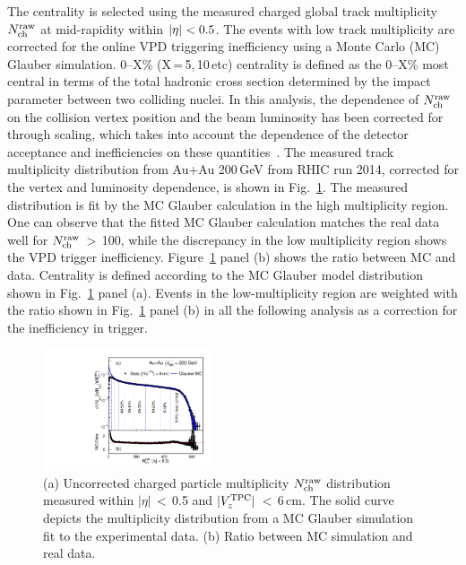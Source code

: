 \documentclass[%
 reprint,	
showpacs,
 amsmath,amssymb,
 aps,
 prc,
]{revtex4-1}
\begin{document}
The centrality is selected using the measured charged global track multiplicity $N_{\rm ch}^{\rm raw}$ at mid-rapidity within $|\eta|\ \rm{ < 0.5}$. The events with low track multiplicity are corrected for the online VPD triggering inefficiency using a Monte Carlo (MC) Glauber simulation. 0--X\% (X\,=\,5,\,10\,etc) centrality is defined as the 0--X\% most central in terms of the total hadronic cross section determined by the impact parameter between two colliding nuclei. In this analysis, the dependence of $N_{\rm ch}^{\rm raw}$ on the collision vertex position and the beam luminosity has been corrected for through scaling, which takes into account the dependence of the detector acceptance and inefficiencies on these quantities~\cite{PhysRevC.88.014902}. The measured track multiplicity distribution from Au+Au 200\,GeV from RHIC run 2014, corrected for the vertex and luminosity dependence, is shown in Fig.~\ref{fig:centrality}. The measured distribution is fit by the MC Glauber calculation in the high multiplicity region. One can observe that the fitted MC Glauber calculation matches the real data well for $N_{\rm ch}^{\rm raw}$\,$>$\,100, while the discrepancy in the low multiplicity region shows the VPD trigger inefficiency. Figure~\ref{fig:centrality} panel (b) shows the ratio between MC and data. Centrality is defined according to the MC Glauber model distribution shown in Fig.~\ref{fig:centrality} panel (a). Events in the low-multiplicity region are weighted with the ratio shown in Fig.~\ref{fig:centrality} panel (b) in all the following analysis as a correction for the inefficiency in trigger. 

\begin{figure}[h]
\centering
\includegraphics[width=0.45\textwidth]{fig/centrality.pdf}
  \caption{(a) Uncorrected charged particle multiplicity $N_{\rm ch}^{\rm raw}$ distribution measured within $|\eta|$\,$<$\,0.5 and $|V_z^{\rm{TPC}}|$\,$<$\,6\,cm. The solid curve depicts the multiplicity distribution from a MC Glauber simulation fit to the experimental data. (b) Ratio between MC simulation and real data.}
\label{fig:centrality} 
\end{figure}
\end{document}
